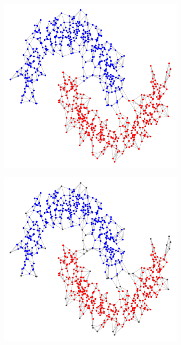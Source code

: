 \documentclass{article}
\newcommand{\1}{\mathbf{1}}
\theoremstyle{aldenthm}
\theoremstyle{aldenrmrk}
\begin{document}
\begin{figure}
\begin{adjustbox}{minipage=\linewidth,scale=0.8}
\begin{subfigure}{.24\linewidth}
		\caption{}
	\end{subfigure}
	\begin{subfigure}{.24\linewidth}
		\includegraphics[width=\linewidth]{example2plots/row2_conductance_cluster}
		\caption{}
	\end{subfigure}
	\begin{subfigure}{.24\linewidth}
		\includegraphics[width=\linewidth]{example2plots/row2_density_cluster}
		\caption{}
	\end{subfigure}
	

\end{adjustbox}
\end{figure}
\end{document}
